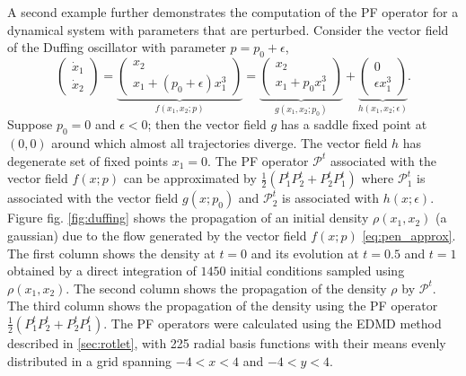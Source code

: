 \documentclass[pdflatex,sn-mathphys]{sn-jnl}%
\theoremstyle{thmstyleone}%
\theoremstyle{thmstyletwo}%
\theoremstyle{thmstylethree}%
\begin{document}
A second example further demonstrates the computation of the PF operator for a dynamical system with parameters that are perturbed. Consider the vector field of the Duffing oscillator with parameter $p = p_0 + \epsilon$,
\begin{equation}\label{eq:duffing}
\begin{pmatrix}
    \dot{x}_1 \\
    \dot{x}_2
\end{pmatrix} 
= \underbrace{\begin{pmatrix}
 x_2\\
 x_1 + (p_0 + \epsilon) x_1^3
\end{pmatrix}}_{f(x_1,x_2;p)} =
\underbrace{\begin{pmatrix}
 x_2\\
   x_1 + p_0 x_1^3
\end{pmatrix}}_{g(x_1,x_2;p_0)}
+
\underbrace{\begin{pmatrix}
 0\\
  \epsilon x_1^3
\end{pmatrix}}_{h(x_1,x_2; \epsilon )}.
\end{equation}
Suppose $p_0=0$ and $\epsilon <0$; then the vector field $g$ has a saddle fixed point at $(0,0)$ around which almost all trajectories diverge. The vector field $h$ has  degenerate set of fixed points $x_1=0$. The  PF operator $\mathcal{P}^t$ associated with the vector field $f(x;p)$ can be approximated by $\frac{1}{2}\left(P_1^tP_2^t+P_2^t P_1^t \right)$ where $\mathcal{P}_1^t$ is associated with the vector field $g(x;p_0)$ and $\mathcal{P}_2^t$ is associated with $h(x;\epsilon )$. Figure fig. \ref{fig:duffing} shows the propagation of an initial density $\rho(x_1,x_2)$ (a gaussian) due to the flow generated by the vector field $f(x;p)$ \eqref{eq:pen_approx}. The first column shows the density at $t=0$ and its evolution at $t=0.5$ and $t=1$ obtained by a direct integration of $1450$ initial conditions sampled using $\rho(x_1,x_2)$. The second column shows the propagation of the density $\rho$ by $\mathcal{P}^t$. The third column shows the propagation of the density using the PF operator $\frac{1}{2}(P_1^tP_2^t + P_2^tP_1^t)$. The PF operators were calculated using the EDMD method described in \ref{sec:rotlet}, with 225 radial basis functions with their means evenly distributed in a grid spanning $-4<x<4$ and $-4<y<4$.
\end{document}

